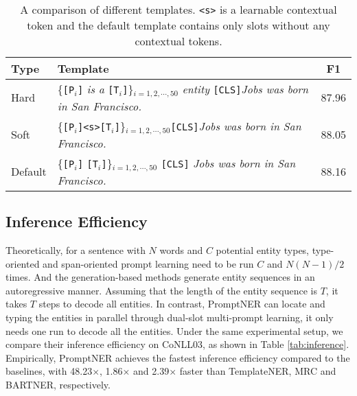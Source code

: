 \documentclass[11pt]{article}
\begin{document}
\begin{table}[!htp]
    \centering
    \small
    \begin{tabular}{>{\arraybackslash}p{0.7cm}>{\arraybackslash}p{4.1cm}c}
    \toprule
        Type & Template &  F1 \\ 
    \midrule
Hard & \multicolumn{1}{m{4.9cm}} {\{\texttt{[P$_i$]}\textit{ is a }\texttt{[T$_i$]}\}$_{i=1,2,\cdots,50}$\textit{ entity }\texttt{[CLS]}\textit{Jobs was born in San Francisco.}}  & 87.96 \\
\midrule
Soft & \multicolumn{1}{m{4.9cm}} {\{\texttt{[P$_i$]}\texttt{<s>}\texttt{[T$_i$]}\}$_{i=1,2,\cdots,50}$\texttt{[CLS]}\textit{Jobs was born in San Francisco.}}  & 88.05 \\
\midrule
Default & \multicolumn{1}{m{4.9cm}} {\{\texttt{[P$_i$]} \texttt{[T$_i$]}\}$_{i=1,2,\cdots,50}$ \texttt{[CLS]}\textit{ Jobs was born in San Francisco.}}  &  88.16 \\
    \bottomrule
    \end{tabular}
    \caption{A comparison of different templates. \texttt{<s>} is a learnable contextual token and the default template contains only slots without any contextual tokens.}
    \label{tab:template}
\end{table}




\subsection{Inference Efficiency}
Theoretically, for a sentence with $N$ words and $C$ potential entity types, type-oriented \citep{li-etal-2020-unified} and span-oriented \citep{cui-etal-2021-template} prompt learning need to be run $C$ and $N(N-1)/2$ times.
And the generation-based methods \citep{yan-etal-2021-unified-generative} generate entity sequences in an autoregressive manner. Assuming that the length of the entity sequence is $T$, it takes $T$ steps to decode all entities.
In contrast, PromptNER can locate and typing the entities in parallel through dual-slot multi-prompt learning, it only needs one run to decode all the entities. Under the same experimental setup, we compare their inference efficiency on CoNLL03, as shown in Table \ref{tab:inference}. Empirically, PromptNER achieves the fastest inference efficiency compared to the baselines, with 48.23$\times$, 1.86$\times$ and 2.39$\times$ faster than TemplateNER, MRC and BARTNER, respectively.
\end{document}
